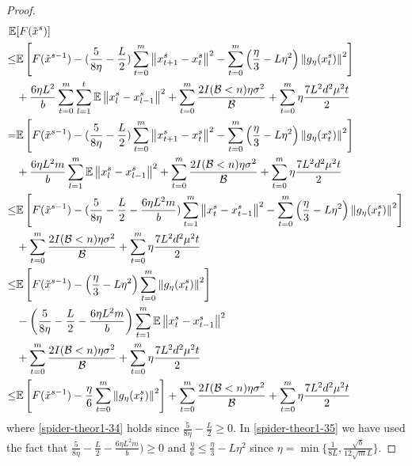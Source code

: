 \documentclass[iicol,sn-basic]{sn-jnl}
\theoremstyle{thmstyleone}%
\theoremstyle{thmstyletwo}%
\theoremstyle{thmstylethree}%
\newcommand*{\E}{\mathbb{E}}
\newcommand{\norm}[1]{\left\lVert#1\right\rVert}
\begin{document}
\begin{proof}
 \begin{align} 
\E&[F(\tilde{x}^s)] \notag
\\ \leq& \E\left[F(\tilde{x}^{s-1}) - (\frac{5}{8\eta} - \frac{L}{2})\sum_{t=0}^m \norm{{x}_{t+1}^s-x_{t}^s}^2- \sum_{t=0}^m \left(\frac{\eta}{3}-L\eta^2\right)\norm{g_{\eta}(x_{t}^s)}^2\right]\notag
\\&+\frac{6\eta L^2}{b}\sum_{t=0}^m \sum_{l=1}^t\E\norm{x_{l}^s-{x}_{l-1}^{s}}^2 + \sum_{t=0}^m \frac{2I(\mathcal{B} < n)\eta \sigma ^2}{\mathcal{B}}+\sum_{t=0}^m \eta \frac{7L^2 d^2 \mu^2 t}{2}
\\ =& \E\left[F(\tilde{x}^{s-1}) - (\frac{5}{8\eta} - \frac{L}{2})\sum_{t=0}^m \norm{{x}_{t+1}^s-x_{t}^s}^2- \sum_{t=0}^m \left(\frac{\eta}{3}-L\eta^2\right)\norm{g_{\eta}(x_{t}^s)}^2\right]\notag
\\&+\frac{6\eta L^2 m}{b} \sum_{l=1}^m\E\norm{x_{l}^s-{x}_{l-1}^{s}}^2 + \sum_{t=0}^m \frac{2I(\mathcal{B} < n)\eta \sigma ^2}{\mathcal{B}}+\sum_{t=0}^m \eta \frac{7L^2 d^2 \mu^2 t}{2}
\\ \leq & \E\left[F(\tilde{x}^{s-1}) - (\frac{5}{8\eta} - \frac{L}{2} - \frac{6\eta L^2 m}{b})\sum_{t=1}^m \norm{{x}_{t}^s-x_{t-1}^s}^2- \sum_{t=0}^m \left(\frac{\eta}{3}-L\eta^2\right)\norm{g_{\eta}(x_{t}^s)}^2\right]\notag
\\& + \sum_{t=0}^m \frac{2I(\mathcal{B} < n)\eta \sigma ^2}{\mathcal{B}}+\sum_{t=0}^m \eta \frac{7L^2 d^2 \mu^2 t}{2} \label{spider-theor1-34}\\
\leq& \E\left[F(\tilde{x}^{s-1}) - \left(\frac{\eta}{3}-L\eta^2\right)\sum_{t=0}^m\norm{g_{\eta}(x_{t}^s)}^2\right]\notag\\
&-\left(\frac{5}{8\eta} - \frac{L}{2}-\frac{6\eta L^2 m}{b}\right)\sum_{t=1}^{m}\E\norm{x_{t}^s- {x}_{t-1}^{s}}^2\notag\\
&+ \sum_{t=0}^m \frac{2I(\mathcal{B} < n)\eta \sigma ^2}{\mathcal{B}} + \sum_{t=0}^m \eta \frac{7 L^2 d^2 \mu^2 t}{2}\notag\\
\leq& \E\left[F(\tilde{x}^{s-1}) - \frac{\eta}{6}\sum_{t=0}^m\norm{g_{\eta}(x_{t}^s)}^2\right]+ \sum_{t=0}^m \frac{2I(\mathcal{B} < n)\eta \sigma ^2}{\mathcal{B}}+\sum_{t=0}^m \eta \frac{7 L^2 d^2 \mu^2 t}{2}\label{spider-theor1-35}
 \end{align}
 where \eqref{spider-theor1-34} holds since $\frac{5}{8\eta} - \frac{L}{2} \geq 0$. In \eqref{spider-theor1-35} we have used the fact that $\frac{5}{8\eta} - \frac{L}{2}-\frac{6\eta L^2 m}{b})\geq 0$ and $\frac{\eta}{6} \leq \frac{\eta}{3}-L\eta^2$ since $\eta = \min\{\frac{1}{8L}, \frac{\sqrt{b}}{12 \sqrt{m}L}\}$. 

\end{proof}
\end{document}
